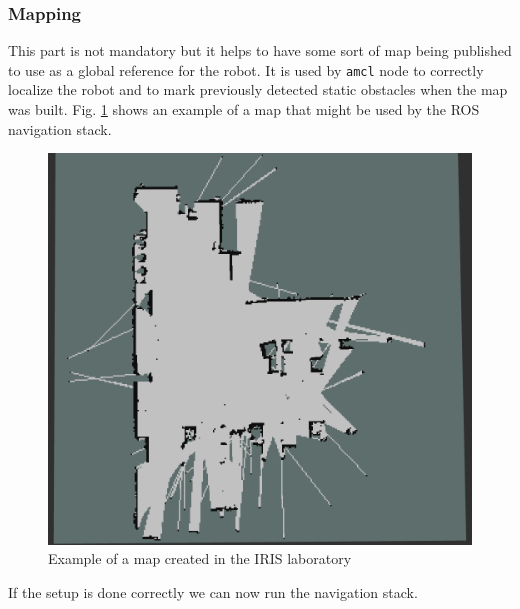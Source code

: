 \subsubsection{Mapping}
This part is not mandatory but it helps to have some sort of map being published to use as a global reference for the robot. It is used by \texttt{amcl} node to correctly localize the robot and to mark previously detected static obstacles when the map was built. Fig. \ref{fig:map} shows an example of a map that might be used by the ROS navigation stack.
\begin{figure}[!htb]
    \centering
    \includegraphics[scale=0.4]{imgs/chapter3/map2.png}
    \caption{Example of a map created in the IRIS laboratory}
    \label{fig:map}
\end{figure}
If the setup is done correctly we can now run the navigation stack.
